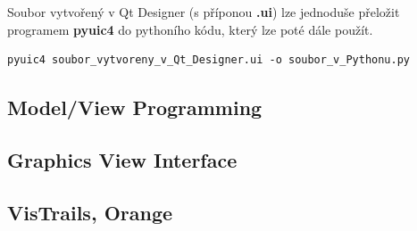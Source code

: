 Soubor vytvořený v Qt Designer (s příponou \textbf{.ui}) lze jednoduše přeložit programem \textbf{pyuic4} do pythoního kódu, který lze poté dále použít. \\

\begin{lstlisting}[label=pyuic4,caption={pyuic4 - přeložení .ui souboru do pythoního kódu}]
		pyuic4 soubor_vytvoreny_v_Qt_Designer.ui -o soubor_v_Pythonu.py 
\end{lstlisting}

\subsection{Model/View Programming}
\subsection{Graphics View Interface}
\subsection{VisTrails, Orange}

